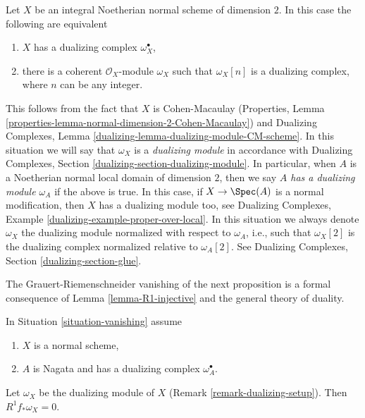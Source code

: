 \begin{remark}
\label{remark-dualizing-setup}
Let $X$ be an integral Noetherian normal scheme of dimension $2$.
In this case the following are equivalent
\begin{enumerate}
\item $X$ has a dualizing complex $\omega_X^\bullet$,
\item there is a coherent $\mathcal{O}_X$-module $\omega_X$ such that
$\omega_X[n]$ is a dualizing complex, where $n$ can be any integer.
\end{enumerate}
This follows from the fact that $X$ is Cohen-Macaulay
(Properties, Lemma \ref{properties-lemma-normal-dimension-2-Cohen-Macaulay}) and
Dualizing Complexes, Lemma \ref{dualizing-lemma-dualizing-module-CM-scheme}.
In this situation we will say that $\omega_X$ is a {\it dualizing module}
in accordance with
Dualizing Complexes, Section \ref{dualizing-section-dualizing-module}.
In particular, when $A$ is a Noetherian normal local domain of dimension
$2$, then we say {\it $A$ has a dualizing module $\omega_A$}
if the above is true. In this case, if $X \to \Spec(A)$ is a normal
modification, then $X$ has a dualizing module too, see
Dualizing Complexes, Example \ref{dualizing-example-proper-over-local}.
In this situation we always denote $\omega_X$ the dualizing
module normalized with respect to $\omega_A$, i.e., such that
$\omega_X[2]$ is the dualizing complex normalized relative to
$\omega_A[2]$. See Dualizing Complexes, Section \ref{dualizing-section-glue}.
\end{remark}

\noindent
The Grauert-Riemenschneider vanishing of the next proposition is a formal
consequence of Lemma \ref{lemma-R1-injective} and the general theory of
duality.

\begin{proposition}
\label{proposition-Grauert-Riemenschneider}
In Situation \ref{situation-vanishing} assume
\begin{enumerate}
\item $X$ is a normal scheme,
\item $A$ is Nagata and has a dualizing complex $\omega_A^\bullet$.
\end{enumerate}
Let $\omega_X$ be the dualizing module of $X$
(Remark \ref{remark-dualizing-setup}). Then $R^1f_*\omega_X = 0$.
\end{proposition}

